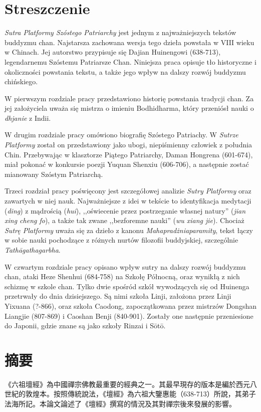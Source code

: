 \makeatletter
\@openrightfalse
\makeatother
\chapter*{Streszczenie}
\textit{Sutra Platformy Szóstego Patriarchy} jest jednym z najważniejszych tekstów buddyzmu chan.
Najstarsza zachowana wersja tego dzieła powstała w VIII wieku w Chinach.
Jej autorstwo przypisuje się Dajian Huinengowi (638-713), legendarnemu Szóstemu Patriarsze Chan.
Niniejsza praca opisuje tło historyczne i okoliczności powstania tekstu, a także jego wpływ na dalszy rozwój buddyzmu chińskiego.

W pierwszym rozdziale pracy przedstawiono historię powstania tradycji chan. Za jej założyciela uważa się mistrza o imieniu Bodhidharma, który przeniósł nauki o \textit{dhjanie} z Indii.

W drugim rozdziale pracy omówiono biografię Szóstego Patriachy.
W \textit{Sutrze Platformy} został on przedstawiony jako ubogi, niepiśmienny człowiek z południa Chin.
Przebywając w klasztorze Piątego Patriarchy, Daman Hongrena (601-674), miał pokonać w konkursie poezji Yuquan Shenxiu (606-706), a następnie zostać mianowany Szóstym Patriarchą.

Trzeci rozdział pracy poświęcony jest szczegółowej analizie \textit{Sutry Platformy} oraz zawartych w niej nauk.
Najważniejsze z idei w tekście to identyfikacja medytacji (\textit{ding}) z mądrością (\textit{hui}), ,,oświecenie przez postrzeganie własnej natury'' (\textit{jian xing cheng fo}), a także tak zwane ,,bezforemne nauki'' (\textit{wu xiang jie}).
Chociaż \textit{Sutrę Platformy} uważa się za dzieło z kanonu \textit{Mahapradżniaparamity}, tekst łączy w sobie nauki pochodzące z różnych nurtów filozofii buddyjskiej, szczególnie \textit{Tathāgathagarbha}.

W czwartym rozdziale pracy opisano wpływ sutry na dalszy rozwój buddyzmu chan, ataki Heze Shenhui (684-758) na Szkołę Północną, oraz wynikłą z nich schizmę w szkole chan.
Tylko dwie spośród szkół wywodzących się od Huinenga przetrwały do dnia dzisiejszego. Są nimi szkoła Linji, założona przez Linji Yixuana (?-866), oraz szkoła Caodong, zapoczątkowana przez mistrzów Dongshan Liangjie (807-869) i Caoshan Benji (840-901).
Zostały one następnie przeniesione do Japonii, gdzie znane są jako szkoły Rinzai i Sōtō.

\chapter*{摘要}
《六祖壇經》為中國禪宗佛教最重要的經典之一。其最早現存的版本是編於西元八世紀的敦煌本。按照傳統說法，《壇經》為六祖大鑒惠能（638-713）所說，其弟子法海所記。本論文論述了《壇經》撰寫的情況及其對禪宗後來發展的影響。

